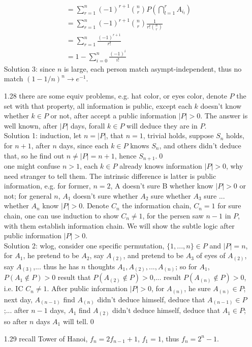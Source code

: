 \documentclass[paper=a4, fontsize=11pt]{scrartcl} %
\numberwithin{equation}{section} %
\numberwithin{figure}{section} %
\numberwithin{table}{section} %
\begin{document}
\begin{itemize}
\begin{align}
			&= \sum_{r=1}^n (-1)^{r+1} {n \choose r}  P(\bigcap_{l=1}^r A_{i_l})\\
			&= \sum_{r=1}^n (-1)^{r+1} {n \choose r} \frac{1}{r! {n\choose r}}\\
			&= \sum_{r=1}^n \frac{(-1)^{r+1}}{r!}\\
			&= 1 - \sum_{i=0}^n \frac{(-1)^i}{i!}
	\end{align}
	Solution 3: since $n$ is large, each person match asympt-independent, thus no match $(1-1/n)^n\rightarrow e^{-1}$.
	\item[1.28] there are some equiv problems, e.g. hat color, or eyes color, denote $P$ the set with that property, all information is public, except each $k$ doesn't know whether $k\in P$ or not, after accept a public information $|P|>0$. The answer is well known, after $|P|$ days, forall $k\in P$ will deduce they are in $P$.\\
	Solution 1: induction, let $n=|P|$, that $n=1$, trivial holds, suppose $S_n$ holds, for $n+1$, after $n$ days, since each $k\in P$ knows $S_n$, and others didn't deduce that, so he find out $n\neq |P|=n+1$, hence $S_{n+1}$.\qed \\
	one might confuse $n>1$, each $k\in P$ already knows information $|P|>0$, why need stranger to tell them. The intrinsic difference is latter is public information, e.g. for former, $n=2$, A doesn't sure B whether know $|P|>0$ or not; for general $n$, $A_1$ doesn't sure whether $A_2$ sure whether $A_3$ sure ... whether $A_n$ know $|P|>0$. Denote $C_n$ the information chain, $C_n=1$ for sure chain, one can use induction to show $C_n\neq 1$, for the persen saw $n-1$ in $P$, with them establish information chain. We will show the subtle logic after public information $|P|>0$.\\
	Solution 2: wlog, consider one specific permutation, $\{1,...,n\}\in P$ and $|P|=n$, for $A_1$, he pretend to be $A_2$, say $A_{(2)}$, and pretend to be $A_3$ of eyes of $A_{(2)}$, say $A_{(3)}$,... thus he has $n$ thoughts $A_1,A_{(2)},...,A_{(n)}$; so for $A_1$, $P(A_1\notin P)>0$ result that $P(A_{(2)}\notin P)>0$,... result $P(A_{(n)}\notin P)>0$, i.e. IC $C_n\neq 1$. After public information $|P|>0$, for $A_{(n)}$, he sure $A_{(n)}\in P$; next day, $A_{(n-1)}$ find $A_{(n)}$ didn't deduce himself, deduce that $A_{(n-1)}\in P$;... after $n-1$ days, $A_1$ find $A_{(2)}$ didn't deduce himself, deduce that $A_1\in P$; so after $n$ days $A_1$ will tell.\qed
	\item[1.29] recall Tower of Hanoi, $f_n = 2f_{n-1} +1$, $f_1=1$, thus $f_n=2^n-1$.

\end{itemize}
\end{document}
